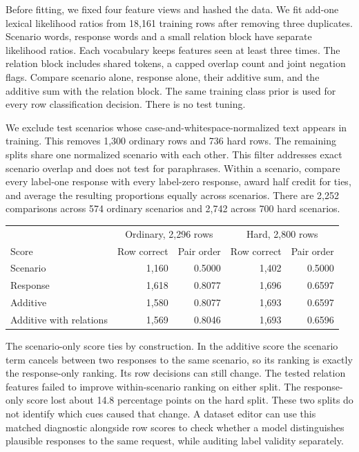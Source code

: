 \documentclass[11pt]{article}
\begin{document}
Before fitting, we fixed four feature views and hashed the
data. We fit add-one lexical likelihood ratios from 18,161
training rows after removing three duplicates. Scenario
words, response words and a small relation block have
separate likelihood ratios. Each vocabulary keeps features
seen at least three times. The relation block includes
shared tokens, a capped overlap count and joint negation
flags. Compare scenario alone, response alone, their
additive sum, and the additive sum with the relation block.
The same training class prior is used for every row
classification decision. There is no test tuning.

We exclude test scenarios whose case-and-whitespace-normalized
text appears in training. This removes 1,300 ordinary rows and
736 hard rows. The remaining splits share one normalized
scenario with each other. This filter addresses exact scenario
overlap and does not test for paraphrases. Within a scenario,
compare every label-one response with every label-zero response,
award half credit for ties, and average the resulting proportions
equally across scenarios. There are 2,252 comparisons across
574 ordinary scenarios and 2,742 across 700 hard scenarios.

\begin{center}
\small
\begin{tabular}{lrrrr}
\toprule
 & \multicolumn{2}{c}{Ordinary, 2,296 rows}
 & \multicolumn{2}{c}{Hard, 2,800 rows} \\
Score & Row correct & Pair order & Row correct & Pair order \\
\midrule
Scenario & 1,160 & 0.5000 & 1,402 & 0.5000 \\
Response & 1,618 & 0.8077 & 1,696 & 0.6597 \\
Additive & 1,580 & 0.8077 & 1,693 & 0.6597 \\
Additive with relations & 1,569 & 0.8046 & 1,693 & 0.6596 \\
\bottomrule
\end{tabular}
\end{center}

The scenario-only score ties by construction. In the additive
score the scenario term cancels between two responses to the
same scenario, so its ranking is exactly the response-only
ranking. Its row decisions can still change. The tested
relation features failed to improve within-scenario ranking
on either split. The response-only score lost about 14.8
percentage points on the hard split. These two splits do
not identify which cues caused that change. A dataset editor
can use this matched diagnostic alongside row scores to check
whether a model distinguishes plausible responses to the
same request, while auditing label validity separately.
\end{document}
